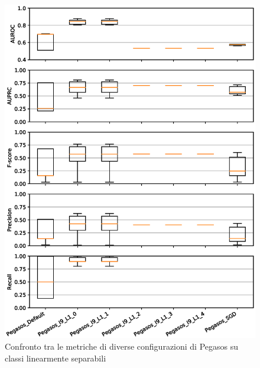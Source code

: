 \documentclass[12pt,a4paper,oneside,hidelinks]{report}
\begin{document}
\vspace*{\fill}


\vspace*{\fill}

\begin{figure}[hb]%
    \centering
    \includegraphics[scale = 0.80]{CC-Pegasos-level1-LS.eps}%
    \caption{Confronto tra le metriche di diverse configurazioni di Pegasos su classi linearmente separabili}%
    \label{figure:illps}%
\end{figure}

\vspace*{\fill}
\end{document}
